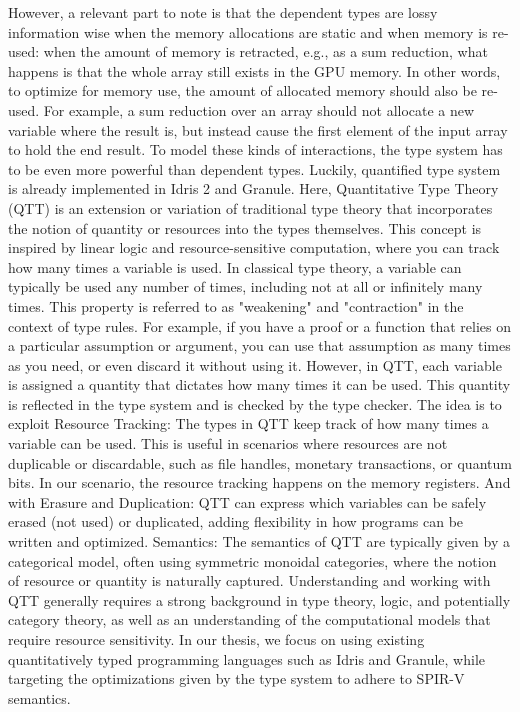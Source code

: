 \documentclass[10pt,a4paper]{article}
\begin{document}
However, a relevant part to note is that the dependent types are lossy information wise when the memory allocations are static and when memory is re-used: when the amount of memory is retracted, e.g., as a sum reduction, what happens is that the whole array still exists in the GPU memory.
In other words, to optimize for memory use, the amount of allocated memory should also be re-used.
For example, a sum reduction over an array should not allocate a new variable where the result is, but instead cause the first element of the input array to hold the end result.
To model these kinds of interactions, the type system has to be even more powerful than dependent types.
Luckily, quantified type system is already implemented in Idris 2 and Granule.
Here, Quantitative Type Theory (QTT) is an extension or variation of traditional type theory that incorporates the notion of quantity or resources into the types themselves. This concept is inspired by linear logic and resource-sensitive computation, where you can track how many times a variable is used.
In classical type theory, a variable can typically be used any number of times, including not at all or infinitely many times. This property is referred to as "weakening" and "contraction" in the context of type rules. For example, if you have a proof or a function that relies on a particular assumption or argument, you can use that assumption as many times as you need, or even discard it without using it.
However, in QTT, each variable is assigned a quantity that dictates how many times it can be used. This quantity is reflected in the type system and is checked by the type checker.
The idea is to exploit Resource Tracking: The types in QTT keep track of how many times a variable can be used. This is useful in scenarios where resources are not duplicable or discardable, such as file handles, monetary transactions, or quantum bits.
In our scenario, the resource tracking happens on the memory registers.
And with Erasure and Duplication: QTT can express which variables can be safely erased (not used) or duplicated, adding flexibility in how programs can be written and optimized.
Semantics: The semantics of QTT are typically given by a categorical model, often using symmetric monoidal categories, where the notion of resource or quantity is naturally captured.
Understanding and working with QTT generally requires a strong background in type theory, logic, and potentially category theory, as well as an understanding of the computational models that require resource sensitivity.
In our thesis, we focus on using existing quantitatively typed programming languages such as Idris and Granule, while targeting the optimizations given by the type system to adhere to SPIR-V semantics.
\end{document}
